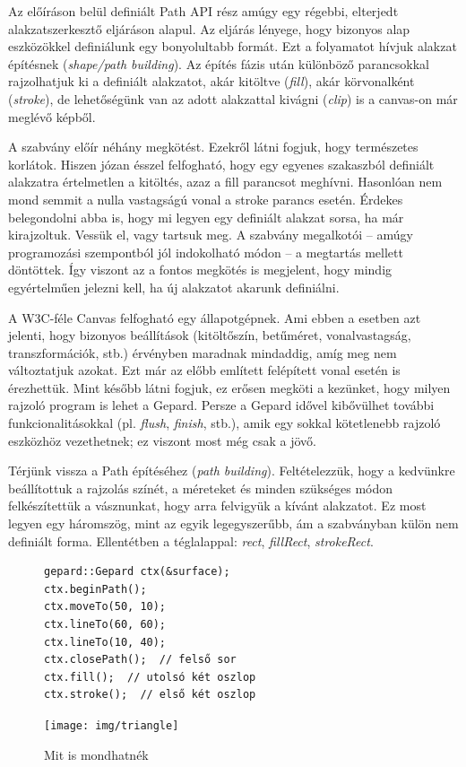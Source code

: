 \documentclass[12pt]{report}
\theoremstyle{definition}
\newcommand{\inenglish}[1]{\textsl{#1}}
\begin{document}
  Az előíráson belül definiált Path API rész amúgy egy régebbi, elterjedt
alakzatszerkesztő eljáráson alapul. Az eljárás lényege, hogy bizonyos alap
eszközökkel definiálunk egy bonyolultabb formát. Ezt a folyamatot hívjuk
alakzat építésnek (\inenglish{shape/path building}). Az építés fázis után
különböző parancsokkal rajzolhatjuk ki a definiált alakzatot, akár kitöltve
(\emph{fill}), akár körvonalként (\emph{stroke}), de lehetőségünk van az adott
alakzattal kivágni (\emph{clip}) is a canvas-on már meglévő képből.

  A szabvány előír néhány megkötést. Ezekről látni fogjuk, hogy természetes
korlátok. Hiszen józan ésszel felfogható, hogy egy egyenes szakaszból definiált
alakzatra értelmetlen a kitöltés, azaz a fill parancsot meghívni. Hasonlóan nem
mond semmit a nulla vastagságú vonal a stroke parancs esetén. Érdekes
belegondolni abba is, hogy mi legyen egy definiált alakzat sorsa, ha már
kirajzoltuk. Vessük el, vagy tartsuk meg. A szabvány megalkotói -- amúgy
programozási szempontból jól indokolható módon -- a megtartás mellett
döntöttek. Így viszont az a fontos megkötés is megjelent, hogy mindig
egyértelműen jelezni kell, ha új alakzatot akarunk definiálni.

  A W3C-féle Canvas felfogható egy állapotgépnek. Ami ebben a esetben azt
jelenti, hogy bizonyos beállítások (kitöltőszín, betűméret, vonalvastagság,
transzformációk, stb.) érvényben maradnak mindaddig, amíg meg nem változtatjuk
azokat. Ezt már az előbb említett felépített vonal esetén is érezhettük. Mint
később látni fogjuk, ez erősen megköti a kezünket, hogy milyen rajzoló program
is lehet a Gepard. Persze a Gepard idővel kibővülhet további funkcionalitásokkal
(pl. \emph{flush}, \emph{finish}, stb.), amik egy sokkal kötetlenebb rajzoló
eszközhöz vezethetnek; ez viszont most még csak a jövő.

  Térjünk vissza a Path építéséhez (\inenglish{path
building}). Feltételezzük, hogy a kedvünkre beállítottuk a rajzolás színét, a
méreteket és minden szükséges módon felkészítettük a vásznunkat, hogy arra
felvigyük a kívánt alakzatot. Ez most legyen egy háromszög, mint az egyik
legegyszerűbb, ám a szabványban külön nem definiált forma. Ellentétben a
téglalappal: \emph{rect}, \emph{fillRect}, \emph{strokeRect}.

  \begin{figure}[!htb]
    \hspace{0.1\textwidth}
      \centering
      \begin{lstlisting}
gepard::Gepard ctx(&surface);
ctx.beginPath();
ctx.moveTo(50, 10);
ctx.lineTo(60, 60);
ctx.lineTo(10, 40);
ctx.closePath();  // felső sor
ctx.fill();  // utolsó két oszlop
ctx.stroke();  // első két oszlop
      \end{lstlisting}
    \endminipage
    \hfill
      \texttt{[image: img/triangle]}
    \endminipage
    \caption{\label{triangles-code-and-image} Mit is mondhatnék}
  \end{figure}
\end{document}
